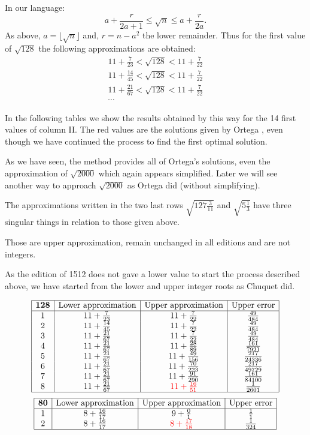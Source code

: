 \documentclass{amsart}
\begin{document}
In our language:
$$a+\frac{r}{2a+1} \leq \sqrt{n}\leq a+\frac{r}{2a}. $$
As above, $a=\lfloor \sqrt{n}\rfloor$ and, $r=n-a^2$ the lower remainder.
Thus for the first value of $\sqrt{128}$ the following approximations are obtained:
$$\begin{array}{c}
11+\frac{7}{23}<\sqrt{128}<11+\frac{7}{22}\\
11+\frac{14}{45}<\sqrt{128}<11+\frac{7}{22}\\
11+\frac{21}{67}<\sqrt{128}<11+\frac{7}{22}\\
\cdots 
\end{array}$$

In the following tables we show the results obtained by this way for the 14 first values of column II. The red values are the solutions given by Ortega , even though we have continued the process to find the first optimal solution.

As we have seen, the method provides all of Ortega's solutions, even the approximation of $\sqrt{2000}$ which again appears simplified. Later we will see another way to approach $\sqrt{2000}$ as Ortega did (without simplifying).

The approximations written in the two last rows $\sqrt{127\frac{3}{11}}$ and $\sqrt{5\frac{1}{3}}$ have three singular things in relation to those given above.

 Those are upper approximation,
 remain unchanged in all editions and are not integers. 
 
 As the edition of 1512 does not gave a lower value to start the process described above, we have started from the lower and upper integer roots as Chuquet did.

 $$\begin{array}{|c|c|c|c|}
 \hline
 {\bf 128}&\text{Lower approximation}&\text{Upper approximation}&\text{Upper error}\\
 \hline
1&11+\frac{7}{23}&11+\frac{7}{22}&\frac{49}{484}\\
2&11+\frac{14}{45}&11+\frac{7}{22}&\frac{49}{484}\\
3&11+\frac{21}{67}&11+\frac{7}{22}&\frac{49}{484}\\
4&11+\frac{21}{67}&11+\frac{28}{89}&\frac{161}{7921}\\
5&11+\frac{21}{67}&11+\frac{49}{156}&\frac{217}{24336}\\
6&11+\frac{21}{67}&11+\frac{70}{223}&\frac{217}{49729}\\
7&11+\frac{21}{67}&11+\frac{91}{290}&\frac{161}{84100}\\
8&11+\frac{21}{67}&{\color{red}11+\frac{16}{51}}&\frac{1}{2601}\\
\hline
\end{array}$$
 $$\begin{array}{|c|c|c|c|}
 \hline
 {\bf 80}&\text{Lower approximation}&\text{Upper approximation}&\text{Upper error}\\
 \hline
 1&8+\frac{16}{17}&9+\frac{0}{1}&\frac{1}{1}\\
2&8+\frac{16}{17}&{\color{red}8+\frac{17}{18}}&\frac{1}{324}\\
 \hline
\end{array}$$
\end{document}
